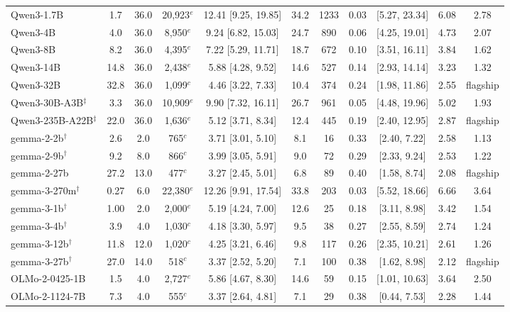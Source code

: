 \begin{table}[htbp]
\begin{threeparttable}
\begin{tabular}{@{}lcccccccccc@{}}
Qwen3-1.7B & 1.7 & 36.0 & 20,923$^{e}$ & 12.41 [9.25, 19.85] & 34.2 & 1233 & 0.03 & [5.27, 23.34] & 6.08 & 2.78 \\
Qwen3-4B & 4.0 & 36.0 & 8,950$^{e}$ & 9.24 [6.82, 15.03] & 24.7 & 890 & 0.06 & [4.25, 19.01] & 4.73 & 2.07 \\
Qwen3-8B & 8.2 & 36.0 & 4,395$^{e}$ & 7.22 [5.29, 11.71] & 18.7 & 672 & 0.10 & [3.51, 16.11] & 3.84 & 1.62 \\
Qwen3-14B & 14.8 & 36.0 & 2,438$^{e}$ & 5.88 [4.28, 9.52] & 14.6 & 527 & 0.14 & [2.93, 14.14] & 3.23 & 1.32 \\
Qwen3-32B & 32.8 & 36.0 & 1,099$^{c}$ & 4.46 [3.22, 7.33] & 10.4 & 374 & 0.24 & [1.98, 11.86] & 2.55 & flagship \\
\addlinespace
Qwen3-30B-A3B$^{\ddagger}$ & 3.3 & 36.0 & 10,909$^{e}$ & 9.90 [7.32, 16.11] & 26.7 & 961 & 0.05 & [4.48, 19.96] & 5.02 & 1.93 \\
Qwen3-235B-A22B$^{\ddagger}$ & 22.0 & 36.0 & 1,636$^{e}$ & 5.12 [3.71, 8.34] & 12.4 & 445 & 0.19 & [2.40, 12.95] & 2.87 & flagship \\
\addlinespace
gemma-2-2b$^{\dagger}$ & 2.6 & 2.0 & 765$^{c}$ & 3.71 [3.01, 5.10] & 8.1 & 16 & 0.33 & [2.40, 7.22] & 2.58 & 1.13 \\
gemma-2-9b$^{\dagger}$ & 9.2 & 8.0 & 866$^{c}$ & 3.99 [3.05, 5.91] & 9.0 & 72 & 0.29 & [2.33, 9.24] & 2.53 & 1.22 \\
gemma-2-27b & 27.2 & 13.0 & 477$^{c}$ & 3.27 [2.45, 5.01] & 6.8 & 89 & 0.40 & [1.58, 8.74] & 2.08 & flagship \\
\addlinespace
gemma-3-270m$^{\dagger}$ & 0.27 & 6.0 & 22,380$^{e}$ & 12.26 [9.91, 17.54] & 33.8 & 203 & 0.03 & [5.52, 18.66] & 6.66 & 3.64 \\
gemma-3-1b$^{\dagger}$ & 1.00 & 2.0 & 2,000$^{e}$ & 5.19 [4.24, 7.00] & 12.6 & 25 & 0.18 & [3.11, 8.98] & 3.42 & 1.54 \\
gemma-3-4b$^{\dagger}$ & 3.9 & 4.0 & 1,030$^{c}$ & 4.18 [3.30, 5.97] & 9.5 & 38 & 0.27 & [2.55, 8.59] & 2.74 & 1.24 \\
gemma-3-12b$^{\dagger}$ & 11.8 & 12.0 & 1,020$^{c}$ & 4.25 [3.21, 6.46] & 9.8 & 117 & 0.26 & [2.35, 10.21] & 2.61 & 1.26 \\
gemma-3-27b$^{\dagger}$ & 27.0 & 14.0 & 518$^{c}$ & 3.37 [2.52, 5.20] & 7.1 & 100 & 0.38 & [1.62, 8.98] & 2.12 & flagship \\
\addlinespace
OLMo-2-0425-1B & 1.5 & 4.0 & 2,727$^{e}$ & 5.86 [4.67, 8.30] & 14.6 & 59 & 0.15 & [1.01, 10.63] & 3.64 & 2.50 \\
OLMo-2-1124-7B & 7.3 & 4.0 & 555$^{c}$ & 3.37 [2.64, 4.81] & 7.1 & 29 & 0.38 & [0.44, 7.53] & 2.28 & 1.44 \\

\end{tabular}
\end{threeparttable}
\end{table}
